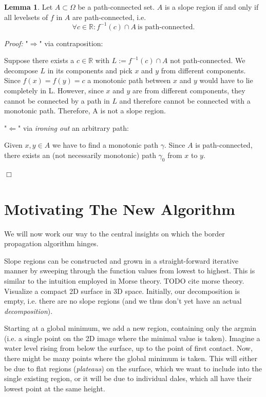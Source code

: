 \documentclass[a4paper,12pt]{paper}
\theoremstyle{plain}
\theoremstyle{definition}
\newtheorem{lem}[thm]{Lemma}
\begin{document}
\begin{lem}
Let $A \subset \Omega$ be a path-connected set. $A$ is a slope region if and only if all levelsets of $f$ in $A$ are path-connected, i.e.
\begin{equation*}
\forall c \in \mathbb{R}: f^{-1}(c) \cap A ~ \text{is path-connected}.
\end{equation*}

\emph{Proof:} "$\Rightarrow$" via contraposition:

Suppose there exists a $c \in \mathbb{R}$ with $L := f^{-1}(c) \cap A$ not path-connected. We decompose $L$ in its components and pick $x$ and $y$ from different components. Since $f(x) = f(y) = c$ a monotonic path between $x$ and $y$ would have to lie completely in L. However, since $x$ and $y$ are from different components, they cannot be connected by a path in $L$ and therefore cannot be connected with a monotonic path. Therefore, A is not a slope region.

"$\Leftarrow$" via \emph{ironing out} an arbitrary path:

Given $x, y \in A$ we have to find a monotonic path $\gamma$. Since $A$ is path-connected, there exists an (not necessarily monotonic) path $\gamma_0$ from $x$ to $y$.




\hfill $\Box$
\end{lem}


\section{Motivating The New Algorithm}
We will now work our way to the central insights on which the border propagation algorithm hinges.

Slope regions can be constructed and grown in a straight-forward iterative manner by sweeping through the function values from lowest to highest. This is similar to the intuition employed in Morse theory. TODO cite morse theory. Visualize a compact 2D surface in 3D space. Initially, our decomposition is empty, i.e. there are no slope regions (and we thus don't yet have an actual \emph{decomposition}).

Starting at a global minimum, we add a new region, containing only the argmin (i.e. a single point on the 2D image where the minimal value is taken). Imagine a water level rising from below the surface, up to the point of first contact. Now, there might be many points where the global minimum is taken. This will either be due to flat regions (\emph{plateaus}) on the surface, which we want to include into the single existing region, or it will be due to individual dales, which all have their lowest point at the same height.
\end{document}
